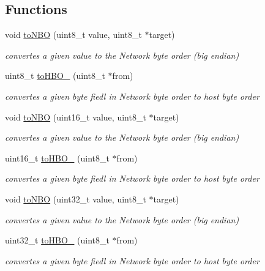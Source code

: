 \subsection*{Functions}
\begin{DoxyCompactItemize}
\item 
void \hyperlink{namespacellu_1_1network_a9db735ab1f182142c349fc313e33c32d}{to\+N\+B\+O} (uint8\+\_\+t value, uint8\+\_\+t $\ast$target)
\begin{DoxyCompactList}\small\item\em convertes a given value to the Network byte order (big endian) \end{DoxyCompactList}\item 
uint8\+\_\+t \hyperlink{namespacellu_1_1network_aec38b31ea6f294a14c7c3f9e426b312d}{to\+H\+B\+O\+\_} (uint8\+\_\+t $\ast$from)
\begin{DoxyCompactList}\small\item\em convertes a given byte fiedl in Network byte order to host byte order \end{DoxyCompactList}\item 
void \hyperlink{namespacellu_1_1network_aa1dd1b9198bfbe8d3fd01ca358d8d538}{to\+N\+B\+O} (uint16\+\_\+t value, uint8\+\_\+t $\ast$target)
\begin{DoxyCompactList}\small\item\em convertes a given value to the Network byte order (big endian) \end{DoxyCompactList}\item 
uint16\+\_\+t \hyperlink{namespacellu_1_1network_a6c358826dbd0c43ec751139dca87ab71}{to\+H\+B\+O\+\_} (uint8\+\_\+t $\ast$from)
\begin{DoxyCompactList}\small\item\em convertes a given byte fiedl in Network byte order to host byte order \end{DoxyCompactList}\item 
void \hyperlink{namespacellu_1_1network_a0132a9cde9b08a16e9b05709ea16a2b9}{to\+N\+B\+O} (uint32\+\_\+t value, uint8\+\_\+t $\ast$target)
\begin{DoxyCompactList}\small\item\em convertes a given value to the Network byte order (big endian) \end{DoxyCompactList}\item 
uint32\+\_\+t \hyperlink{namespacellu_1_1network_a2222539df59075cc6f892b12956968eb}{to\+H\+B\+O\+\_} (uint8\+\_\+t $\ast$from)
\begin{DoxyCompactList}\small\item\em convertes a given byte fiedl in Network byte order to host byte order \end{DoxyCompactList}\item 

\end{DoxyCompactItemize}
